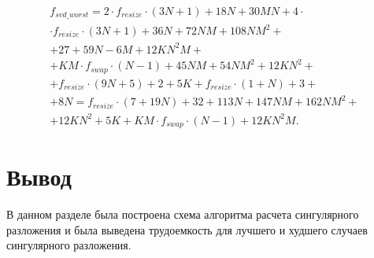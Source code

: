\begin{equation}
	\begin{gathered}
		f_{svd\_worst} = 2 \cdot f_{resize} \cdot (3N + 1) + 18N + 30MN + 4 \cdot\\\cdot f_{resize} \cdot (3N + 1) + 36N + 72NM + 108NM^2 +\\+ 
		27 + 59N -6M + 12KN^2M +\\+ KM \cdot f_{swap} \cdot (N - 1) + 45NM + 54NM^2 + 12KN^2 +\\+
		f_{resize} \cdot (9N + 5) + 2 + 5K + f_{resize} \cdot (1 + N) + 3 +\\+ 8N = f_{resize} \cdot (7 + 19N) + 32 + 113N + 147NM + 162NM^2 +\\+ 12KN^2 + 5K + KM \cdot f_{swap} \cdot (N - 1) + 12KN^2M.
	\end{gathered}
\end{equation}





\section*{Вывод}

В данном разделе была построена схема алгоритма расчета сингулярного разложения и была выведена трудоемкость для лучшего и худшего случаев сингулярного разложения.









